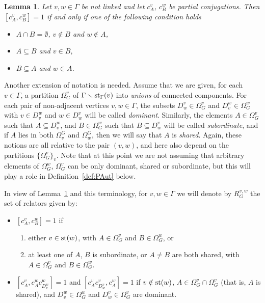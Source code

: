 \documentclass[10pt]{amsart}
\newtheorem{lemma}[theorem]{Lemma}
\theoremstyle{definition}
\newcommand{\st}{{\rm st}}
\theoremstyle{definition}
\numberwithin{equation}{section}
\begin{document}
\begin{lemma}\label{lem:relators} Let $v,w\in\Gamma$ be not linked and let $c^v_A$, $c^w_B$ be partial conjugations.  Then
$[c_A^v,c_B^w]=1$ if and only if one of the following condition holds
\begin{itemize}
\item[i)] $A\cap B=\emptyset$, $v\not\in B$ and $w\not\in A$,
\item[ii)] $A\subseteq B$ and $v\in B$,
\item[iii)] $B\subseteq A$ and $w\in A$.
\end{itemize}
\end{lemma}

Another extension of notation is needed. Assume that we are given, for each $v \in \Gamma$, a partition $\Omega_G^v$ of $\Gamma \smallsetminus \st_\Gamma(v)$ into  \emph{unions} of connected components. For each pair of non-adjacent vertices $v,w\in\Gamma$, the subsets $D_w^v\in\Omega_G^v$ and $D_v^w\in\Omega_G^w$ with $v\in D_v^w$ and $w\in D_w^v$ will be called {\sl dominant}. Similarly, the elements $A\in\Omega_G^v$ such that $A\subseteq D_v^w$, and $B \in \Omega_G^w$ such that $B \subseteq D_w^v$ will be called {\sl subordinate}, and if $A$ lies in both $\Omega_v^G$ and $\Omega_w^G$, then we will say that $A$ is {\sl shared}. Again, these notions are all relative to the pair $(v,w)$, and here also depend on the partitions $\{\Omega_G^v\}_v$. Note that at this point we are not assuming that arbitrary elements  of $\Omega_G^w$, $\Omega_G^v$ can be only dominant, shared or subordinate, but this will play a role in Definition~\ref{def:PAut}  below.

In view of Lemma~\ref{lem:relators} and  this terminology, for $v,w \in \Gamma$ we will denote by $R^{v,w}_G$ the set of relators given by:
\begin{itemize}
\item $[c^v_A,c^w_B]=1$ if
\begin{enumerate}
 \item[(i)] either $v \in \st(w)$, with $A \in \Omega_G^v$ and $B \in \Omega_G^w$, or
 \item[(ii)] at least one of $A$, $B$ is subordinate, or $A\neq B$ are both shared, with $A \in \Omega_G^v$ and $B \in \Omega_G^w$.
\end{enumerate}
\item $[c_A^v,c_A^w c_{D_v^w}^w]=1$ and $[c_A^v c_{D_w^v}^v,c_A^w]=1$  if $v \notin \st(w)$,  $A \in \Omega_G^v \cap \Omega_G^v$ (that is, $A$ is shared), and $D_v^w \in \Omega_G^w$ and $D_w^v \in \Omega_G^v$ are dominant.
\end{itemize}
\end{document}
